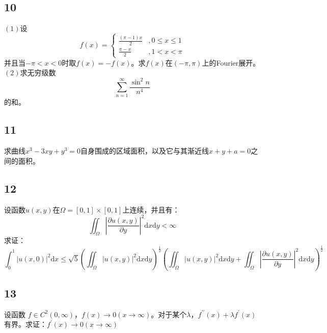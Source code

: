 \documentclass[a4paper,12pt]{article}
\begin{document}
\subsection*{10}\noindent$\left(1\right)$设
\begin{equation*}
	f\left(x\right)=\left\{
	\begin{aligned}
	\frac{\left(\pi-1\right)x}{2}&,0\leq x\leq 1\\
	\frac{\pi-x}{2}&,1<x<\pi
	\end{aligned}
	\right.
\end{equation*}
并且当$-\pi<x<0$时取$f(x)=-f(x)$。求$f(x)$在$\left(-\pi,\pi\right)$上的Fourier展开。\\
\noindent$\left(2\right)$求无穷级数\begin{equation*}
	\sum_{n=1}^{\infty}\frac{\sin^2 n}{n^4}
\end{equation*}
的和。
\subsection*{11}\noindent 求曲线$x^3-3xy+y^3=0$自身围成的区域面积，以及它与其渐近线$x+y+a=0$之间的面积。
\subsection*{12}\noindent 设函数$u\left(x,y\right)$在$\Omega=[0,1]\times\left[0,1\right]$上连续，并且有：
\begin{equation*}
	\iint_{\Omega}\left|\frac{\partial u\left(x,y\right)}{\partial y}\right|^{2}\mathrm{d}x\mathrm{d}y<\infty
\end{equation*}
求证：
\begin{equation*}
	\int_{0}^{1}\left|u\left(x,0\right)\right|^2\mathrm{d}x\leq\sqrt{5}\left(\iint_{\Omega}\left|u\left(x,y\right)\right|^2\mathrm{d}x\mathrm{d}y\right)^{\frac{1}{2}}\left(
	\iint_{\Omega}\left|u\left(x,y\right)\right|^2\mathrm{d}x\mathrm{d}y+\iint_{\Omega}\left|\frac{\partial u\left(x,y\right)}{\partial y}\right|^2\mathrm{d}x\mathrm{d}y\right)^{\frac{1}{2}}
\end{equation*}
\subsection*{13}\noindent 设函数
$f\in C^2\left(0,\infty\right)$，$f\left(x\right)\rightarrow0\left(x\rightarrow\infty\right)$。对于某个$\lambda$，$f^{\prime\prime}\left(x\right)+\lambda f^{\prime}\left(x\right)$
有界。求证：$f^{\prime}\left(x\right)\rightarrow0\left(x\rightarrow\infty\right)$
\end{document}
